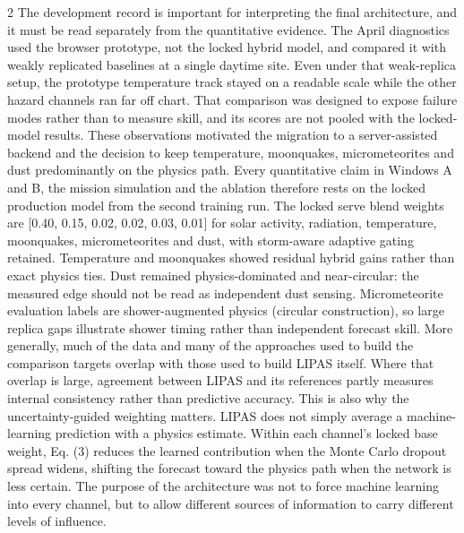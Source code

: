 \begin{multicols}{2}
The development record is important for interpreting the final architecture, and it must be read separately from the quantitative evidence. The April diagnostics used the browser prototype, not the locked hybrid model, and compared it with weakly replicated baselines at a single daytime site. Even under that weak-replica setup, the prototype temperature track stayed on a readable scale while the other hazard channels ran far off chart. That comparison was designed to expose failure modes rather than to measure skill, and its scores are not pooled with the locked-model results. These observations motivated the migration to a server-assisted backend and the decision to keep temperature, moonquakes, micrometeorites and dust predominantly on the physics path. Every quantitative claim in Windows A and B, the mission simulation and the ablation therefore rests on the locked production model from the second training run. The locked serve blend weights are [0.40, 0.15, 0.02, 0.02, 0.03, 0.01] for solar activity, radiation, temperature, moonquakes, micrometeorites and dust, with storm-aware adaptive gating retained. Temperature and moonquakes showed residual hybrid gains rather than exact physics ties. Dust remained physics-dominated and near-circular: the measured edge should not be read as independent dust sensing. Micrometeorite evaluation labels are shower-augmented physics (circular construction), so large replica gaps illustrate shower timing rather than independent forecast skill. More generally, much of the data and many of the approaches used to build the comparison targets overlap with those used to build LIPAS itself. Where that overlap is large, agreement between LIPAS and its references partly measures internal consistency rather than predictive accuracy. This is also why the uncertainty-guided weighting matters. LIPAS does not simply average a machine-learning prediction with a physics estimate. Within each channel's locked base weight, Eq. (3) reduces the learned contribution when the Monte Carlo dropout spread widens, shifting the forecast toward the physics path when the network is less certain. The purpose of the architecture was not to force machine learning into every channel, but to allow different sources of information to carry different levels of influence.


\end{multicols}
